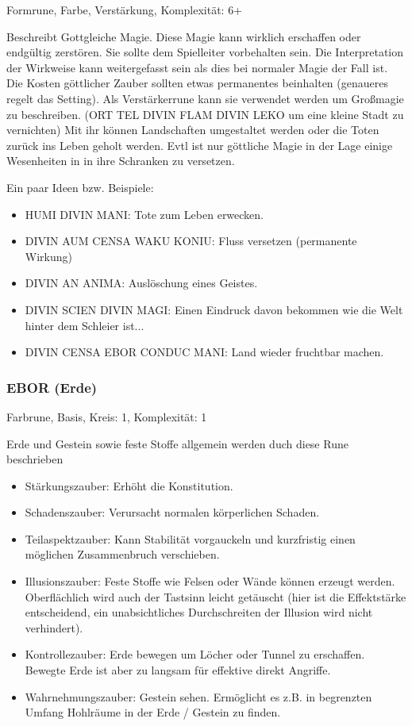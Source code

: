 \documentclass{article}
\begin{document}
Formrune, Farbe, Verstärkung, Komplexität: 6+

Beschreibt Gottgleiche Magie. Diese Magie kann wirklich erschaffen oder endgültig zerstören. Sie sollte dem Spielleiter
vorbehalten sein. Die Interpretation der Wirkweise kann weitergefasst sein als dies bei normaler Magie der Fall ist.
Die Kosten göttlicher Zauber sollten etwas permanentes beinhalten (genaueres regelt das Setting). Als Verstärkerrune
kann sie verwendet werden um Großmagie zu beschreiben. (ORT TEL DIVIN FLAM DIVIN LEKO um eine kleine Stadt zu vernichten)
Mit ihr können Landschaften umgestaltet werden oder die Toten zurück ins Leben geholt werden. Evtl ist nur göttliche
Magie in der Lage einige Wesenheiten in in ihre Schranken zu versetzen.

Ein paar Ideen bzw. Beispiele:

\begin{itemize}
\item HUMI DIVIN MANI: Tote zum Leben erwecken.
\item DIVIN AUM CENSA WAKU KONIU: Fluss versetzen (permanente Wirkung)
\item DIVIN AN ANIMA: Auslöschung eines Geistes.
\item DIVIN SCIEN DIVIN MAGI: Einen Eindruck davon bekommen wie die Welt hinter dem Schleier ist...
\item DIVIN CENSA EBOR CONDUC MANI: Land wieder fruchtbar machen.
\end{itemize}

\subsubsection{EBOR (Erde)}

Farbrune, Basis, Kreis: 1, Komplexität: 1

Erde und Gestein sowie feste Stoffe allgemein werden duch diese Rune beschrieben

\begin{itemize}
\item Stärkungszauber: Erhöht die Konstitution.
\item Schadenszauber: Verursacht normalen körperlichen Schaden.
\item Teilaspektzauber: Kann Stabilität vorgauckeln und kurzfristig einen möglichen Zusammenbruch verschieben.
\item Illusionszauber: Feste Stoffe wie Felsen oder Wände können erzeugt werden. Oberflächlich wird auch der Tastsinn leicht getäuscht (hier ist die Effektstärke entscheidend, ein unabsichtliches Durchschreiten der Illusion wird nicht verhindert).
\item Kontrollezauber: Erde bewegen um Löcher oder Tunnel zu erschaffen. Bewegte Erde ist aber zu langsam für effektive direkt Angriffe.
\item Wahrnehmungszauber: Gestein sehen. Ermöglicht es z.B. in begrenzten Umfang Hohlräume in der Erde / Gestein zu finden.
\end{itemize}
\end{document}
